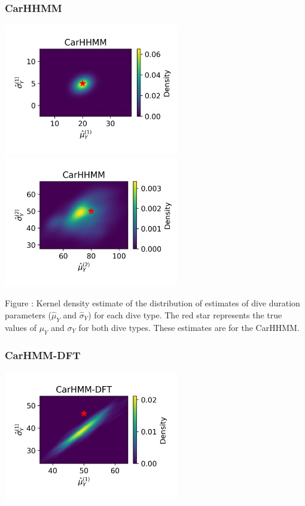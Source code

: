 \documentclass{article}
\begin{document}
        \subsubsection{CarHHMM}
        \begin{center}
        \includegraphics[width=3in]{../Plots/hhmm_V_MLE_density_dive_duration_-1_0.png}
        \includegraphics[width=3in]{../Plots/hhmm_V_MLE_density_dive_duration_-1_1.png}
        \end{center}
        
        \noindent Figure : Kernel density estimate of the distribution of estimates of dive duration parameters ($\hat \mu_Y$ and $\hat \sigma_Y$) for each dive type. The red star represents the true values of $\mu_Y$ and $\sigma_Y$ for both dive types. These estimates are for the CarHHMM.
        \addtocounter{fignum}{1}
        
        \subsubsection{CarHMM-DFT}
        \begin{center}
        \includegraphics[width=3in]{../Plots/hmm_FV_MLE_density_dive_duration_-1_0.png}
        \end{center}
        
\end{document}
